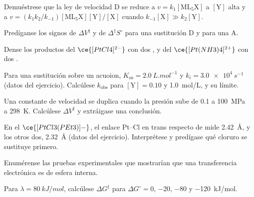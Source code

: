 \begin{exercise}[$\star$]\label{exo:b3:complex-mechanisms:2}
Demuéstrese que la ley de velocidad D se reduce a $v = k_1[\mathrm{ML_5X}]$ a $[\mathrm Y]$ alta y a $v = (k_1k_2/k_{-1})
[\mathrm{ML_5X}][\mathrm Y]/[\mathrm X]$ cuando $k_{-1}[\mathrm X] \gg k_2[\mathrm Y]$.
\end{exercise}

\begin{exercise}[$\star$]\label{exo:b3:complex-mechanisms:3}
Predíganse los signos de $\Delta V^{\ddagger}$ y de $\Delta^{\ddagger}S^\circ$ para una sustitución D y para una A.
\end{exercise}

\begin{exercise}[$\star$]\label{exo:b3:complex-mechanisms:4}
Dense los productos del $\ce{[PtCl4]^{2-}}$ con dos , y del $\ce{[Pt(NH3)4]^{2+}}$ con dos .
\end{exercise}

\begin{exercise}[$\star\star$]\label{exo:b3:complex-mechanisms:5}
Para una sustitución sobre un acuoion, $K_{\mathrm{os}} = \qty{2.0}{L.mol^{-1}}$ y $k_i = \qty{3.0e4}{s^{-1}}$ (datos del
ejercicio). Calcúlese $k_{\mathrm{obs}}$ para $[\mathrm Y] = 0.10$ y \qty{1.0}{mol/L}, y su límite.
\end{exercise}

\begin{exercise}[$\star\star$]\label{exo:b3:complex-mechanisms:6}
Una constante de velocidad se duplica cuando la presión sube de 0.1 a \qty{100}{MPa} a \qty{298}{K}.
Calcúlese $\Delta V^{\ddagger}$ y extráigase una conclusión.
\end{exercise}

\begin{exercise}[$\star\star$]\label{exo:b3:complex-mechanisms:7}
En el $\ce{[PtCl3(PEt3)]-}$, el enlace Pt--Cl en trans respecto de  mide \qty{2.42}{\angstrom}, y los otros dos, \qty{2.32}{\angstrom}
(datos del ejercicio). Interprétese y predígase qué cloruro se sustituye primero.
\end{exercise}

\begin{exercise}[$\star\star$]\label{exo:b3:complex-mechanisms:8}
Enumérense las pruebas experimentales que mostrarían que una transferencia electrónica es de esfera
interna.
\end{exercise}

\begin{exercise}[$\star\star$]\label{exo:b3:complex-mechanisms:9}
Para $\lambda = \qty{80}{kJ/mol}$, calcúlese $\Delta G^{\ddagger}$ para $\Delta G^\circ = 0$, $-20$, $-80$ y \qty{-120}{kJ/mol}.
\end{exercise}

